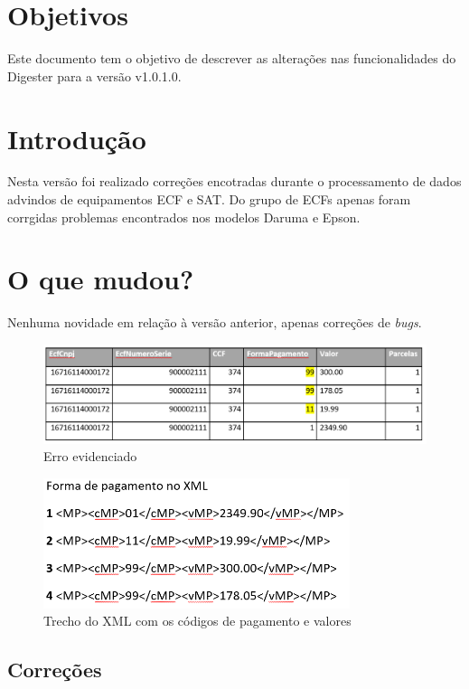 \documentclass{article}      %
\newcommand{\versiondigester}{v1.0.1.0}
\begin{document}
\section{Objetivos}

Este documento tem o objetivo de descrever as alterações nas funcionalidades do Digester para a versão \versiondigester. 


\section{Introdução}     
Nesta versão foi realizado correções encotradas durante o processamento de dados advindos de equipamentos ECF e SAT. Do grupo de ECFs apenas foram corrgidas problemas encontrados nos modelos Daruma e Epson.

\section{O que mudou?}

Nenhuma novidade em relação à versão anterior, apenas correções de \emph{bugs}.


\begin{figure}[!ht]
  \centering
    \includegraphics[width=1.0\textwidth]{tabela.PNG}
    \caption{Erro evidenciado}
    \label{fig:tabela}
\end{figure}

\begin{figure}[!ht]
  \centering
    \includegraphics[width=0.8\textwidth]{cml.PNG}
  \caption{Trecho do XML com os códigos de pagamento e valores}
  \label{fig:xml}
\end{figure}

\subsection{Correções}
\end{document}
